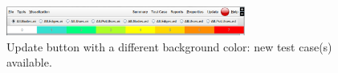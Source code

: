 
\begin{figure}[!ht]
\begin{center}
\includegraphics[width=0.70\textwidth]{fig/update-button.eps}
\caption{\label{fig:update-button} Update button with a different
background color: new test case(s) available.}
\end{center}
\end{figure}
